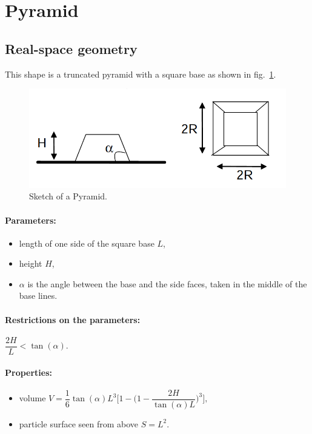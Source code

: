 \newpage{\cleardoublepage}
\section{Pyramid}

\subsection{Real-space geometry}
This shape is a  truncated pyramid with a square base as shown in fig.~\ref{pyramid}.
\begin{figure}[!h]
\begin{center}
\includegraphics[width=0.6\columnwidth]{Figures/pyramid}
\caption{Sketch of a Pyramid.}
\end{center}
\label{pyramid}
\end{figure} 

\par

\paragraph{Parameters:}
\begin{itemize}
\item length of one side of the square base $L$,  
\item height $H$,
\item  $\alpha$ is the angle between the base and the
  side faces, taken in the middle of the base lines.
\end{itemize}

\paragraph{Restrictions on the parameters:} $\dfrac{2H}{L} < \tan(\alpha)$.

\paragraph{Properties:}
\begin{itemize}
\item  volume $V = \dfrac{1}{6} \tan(\alpha) L^3\Big[ 1
             - \big(1 - \dfrac{2H}{\tan(\alpha)L}\big)^3 \Big],$
\item particle surface seen from above $S = L^2$.
\end{itemize}

